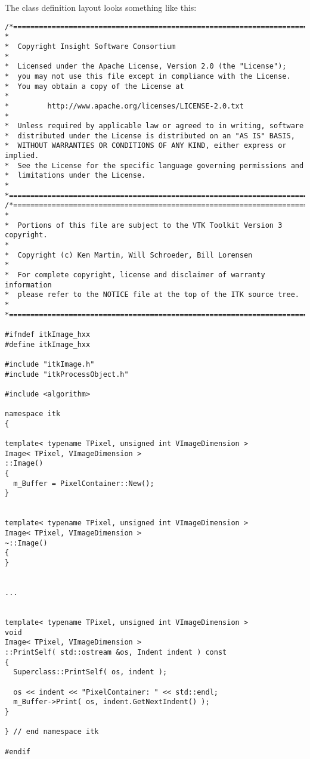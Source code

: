The class definition layout looks something like this:

\small
\begin{verbatim}
/*=========================================================================
*
*  Copyright Insight Software Consortium
*
*  Licensed under the Apache License, Version 2.0 (the "License");
*  you may not use this file except in compliance with the License.
*  You may obtain a copy of the License at
*
*         http://www.apache.org/licenses/LICENSE-2.0.txt
*
*  Unless required by applicable law or agreed to in writing, software
*  distributed under the License is distributed on an "AS IS" BASIS,
*  WITHOUT WARRANTIES OR CONDITIONS OF ANY KIND, either express or implied.
*  See the License for the specific language governing permissions and
*  limitations under the License.
*
*=========================================================================*/
/*=========================================================================
*
*  Portions of this file are subject to the VTK Toolkit Version 3 copyright.
*
*  Copyright (c) Ken Martin, Will Schroeder, Bill Lorensen
*
*  For complete copyright, license and disclaimer of warranty information
*  please refer to the NOTICE file at the top of the ITK source tree.
*
*=========================================================================*/

#ifndef itkImage_hxx
#define itkImage_hxx

#include "itkImage.h"
#include "itkProcessObject.h"

#include <algorithm>

namespace itk
{

template< typename TPixel, unsigned int VImageDimension >
Image< TPixel, VImageDimension >
::Image()
{
  m_Buffer = PixelContainer::New();
}


template< typename TPixel, unsigned int VImageDimension >
Image< TPixel, VImageDimension >
~::Image()
{
}


...


template< typename TPixel, unsigned int VImageDimension >
void
Image< TPixel, VImageDimension >
::PrintSelf( std::ostream &os, Indent indent ) const
{
  Superclass::PrintSelf( os, indent );

  os << indent << "PixelContainer: " << std::endl;
  m_Buffer->Print( os, indent.GetNextIndent() );
}

} // end namespace itk

#endif
\end{verbatim}
\normalsize


